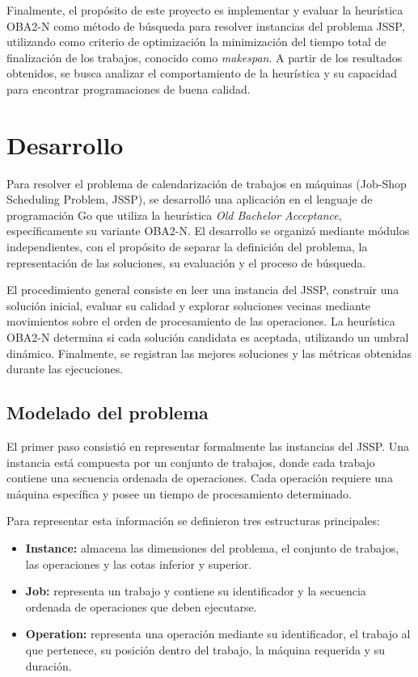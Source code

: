 \documentclass[12pt,a4paper]{article}
\begin{document}
Finalmente, el propósito de este proyecto es implementar y evaluar la heurística OBA2-N como método de búsqueda para resolver instancias del problema JSSP, utilizando como criterio de optimización la minimización del tiempo total de finalización de los trabajos, conocido como \textit{makespan}. A partir de los resultados obtenidos, se busca analizar el comportamiento de la heurística y su capacidad para encontrar programaciones de buena calidad.

\section{Desarrollo}

Para resolver el problema de calendarización de trabajos en máquinas (Job-Shop Scheduling Problem, JSSP), se desarrolló una aplicación en el lenguaje de programación Go que utiliza la heurística \textit{Old Bachelor Acceptance}, específicamente su variante OBA2-N. El desarrollo se organizó mediante módulos independientes, con el propósito de separar la definición del problema, la representación de las soluciones, su evaluación y el proceso de búsqueda.

El procedimiento general consiste en leer una instancia del JSSP, construir una solución inicial, evaluar su calidad y explorar soluciones vecinas mediante movimientos sobre el orden de procesamiento de las operaciones. La heurística OBA2-N determina si cada solución candidata es aceptada, utilizando un umbral dinámico. Finalmente, se registran las mejores soluciones y las métricas obtenidas durante las ejecuciones.

\subsection{Modelado del problema}

El primer paso consistió en representar formalmente las instancias del JSSP. Una instancia está compuesta por un conjunto de trabajos, donde cada trabajo contiene una secuencia ordenada de operaciones. Cada operación requiere una máquina específica y posee un tiempo de procesamiento determinado.

Para representar esta información se definieron tres estructuras principales:

\begin{itemize}
    \item \textbf{Instance:} almacena las dimensiones del problema, el conjunto de trabajos, las operaciones y las cotas inferior y superior.

    \item \textbf{Job:} representa un trabajo y contiene su identificador y la secuencia ordenada de operaciones que deben ejecutarse.

    \item \textbf{Operation:} representa una operación mediante su identificador, el trabajo al que pertenece, su posición dentro del trabajo, la máquina requerida y su duración.
\end{itemize}
\end{document}

